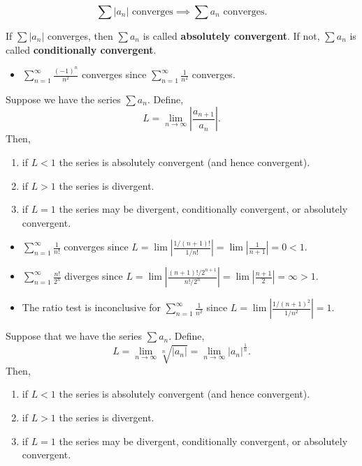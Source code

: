 \begin{thm}
$$\sum |a_n| \text{ converges}\implies \sum a_n\text{ converges}.$$
\end{thm}

If $\sum |a_n|$ converges, then $\sum a_n$ is called \textbf{absolutely convergent}. If not, $\sum a_n$ is called \textbf{conditionally convergent}.


\begin{itemize}
\item $\displaystyle \sum_{n=1}^\infty \frac{(-1)^n}{n^2}$ converges since $\displaystyle \sum_{n=1}^\infty \frac{1}{n^2}$ converges.
\end{itemize}



\begin{thm}
Suppose we have the series $\sum a_{n}$. Define,
$$L=\lim _{n \to \infty} \left|\frac{a_{n+1}}{a_{n}}\right|.$$
Then,
\begin{enumerate}[leftmargin=1em]
    \item if $L<1$ the series is absolutely convergent (and hence convergent).
    \item if $L>1$ the series is divergent.
    \item  if $L=1$ the series may be divergent, conditionally convergent, or absolutely convergent.
\end{enumerate}
\end{thm}


\begin{itemize}
\item $\displaystyle \sum_{n=1}^\infty \frac{1}{n!}$ converges since $\displaystyle L=\lim\left|\frac{1/(n+1)!}{1/n!}\right|=\lim\left|\frac{1}{n+1}\right|=0<1$.
\item $\displaystyle \sum_{n=1}^\infty \frac{n!}{2^n}$ diverges since $\displaystyle L=\lim\left|\frac{(n+1)!/2^{n+1}}{n!/2^{n}}\right|=\lim\left|\frac{n+1}{2}\right|=\infty>1$.
\item The ratio test is inconclusive for $\displaystyle \sum_{n=1}^\infty \frac{1}{n^2}$ since $\displaystyle L=\lim\left|\frac{1/(n+1)^2}{1/n^2}\right|=1$.
\end{itemize}



\begin{thm}
Suppose that we have the series $\sum a_{n}$. Define,
$$L=\lim _{n \to \infty} \sqrt[n]{\left|a_{n}\right|}=\lim _{n \rightarrow \infty}\left|a_{n}\right|^{\frac{1}{n}}.$$
Then,
\begin{enumerate}[leftmargin=1em]
    \item if $L<1$ the series is absolutely convergent (and hence convergent).
    \item if $L>1$ the series is divergent.
    \item if $L=1$ the series may be divergent, conditionally convergent, or absolutely convergent.
\end{enumerate}
\end{thm}




